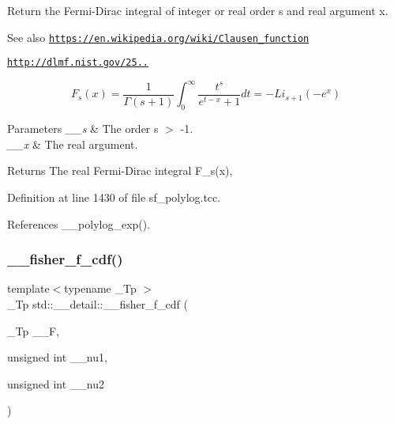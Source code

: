 Return the Fermi-\/\+Dirac integral of integer or real order s and real argument x. \begin{DoxySeeAlso}{See also}
\href{https://en.wikipedia.org/wiki/Clausen_function}{\tt https\+://en.\+wikipedia.\+org/wiki/\+Clausen\+\_\+function} 

\href{http://dlmf.nist.gov/25.12.16}{\tt http\+://dlmf.\+nist.\+gov/25..}
\end{DoxySeeAlso}
\[ F_s(x) = \frac{1}{\Gamma(s+1)}\int_0^\infty \frac{t^s}{e^{t-x} + 1}dt = -Li_{s+1}(-e^x) \]


\begin{DoxyParams}{Parameters}
{\em \+\_\+\+\_\+s} & The order s $>$ -\/1. \\
\hline
{\em \+\_\+\+\_\+x} & The real argument. \\
\hline
\end{DoxyParams}
\begin{DoxyReturn}{Returns}
The real Fermi-\/\+Dirac integral F\+\_\+s(x), 
\end{DoxyReturn}


Definition at line 1430 of file sf\+\_\+polylog.\+tcc.



References \+\_\+\+\_\+polylog\+\_\+exp().

\mbox{\label{namespacestd_1_1____detail_a3825f4b63cdd255c1ca790bf16d844a1}} 
\subsubsection{\texorpdfstring{\+\_\+\+\_\+fisher\+\_\+f\+\_\+cdf()}{\_\_fisher\_f\_cdf()}}
{\footnotesize\ttfamily template$<$typename \+\_\+\+Tp $>$ \\
\+\_\+\+Tp std\+::\+\_\+\+\_\+detail\+::\+\_\+\+\_\+fisher\+\_\+f\+\_\+cdf (\begin{DoxyParamCaption}\item[{\+\_\+\+Tp}]{\+\_\+\+\_\+F,  }\item[{unsigned int}]{\+\_\+\+\_\+nu1,  }\item[{unsigned int}]{\+\_\+\+\_\+nu2 }\end{DoxyParamCaption})}



